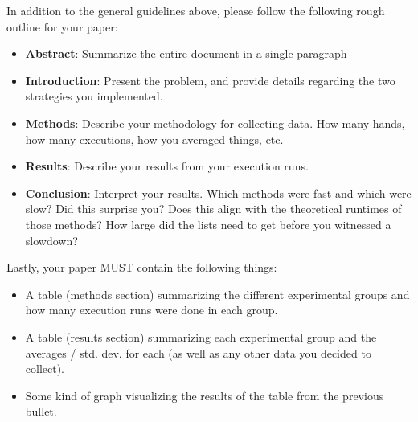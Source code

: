 \documentclass[paper=a4, fontsize=11pt, parskip=full]{scrartcl} %
\numberwithin{equation}{section} %
\numberwithin{figure}{section} %
\numberwithin{table}{section} %
\begin{document}
In addition to the general guidelines above, please follow the following rough outline for your paper:

\begin{itemize}
	\item \textbf{Abstract}: Summarize the entire document in a single paragraph
	\item \textbf{Introduction}: Present the problem, and provide details regarding the two strategies you implemented.
	\item \textbf{Methods}: Describe your methodology for collecting data. How many hands, how many executions, how you averaged things, etc.
	\item \textbf{Results}: Describe your results from your execution runs.
	\item \textbf{Conclusion}: Interpret your results. Which methods were fast and which were slow? Did this surprise you? Does this align with the theoretical runtimes of those methods? How large did the lists need to get before you witnessed a slowdown?
\end{itemize}

Lastly, your paper MUST contain the following things:

\begin{itemize}
	\item A table (methods section) summarizing the different experimental groups and how many execution runs were done in each group.
	\item A table (results section) summarizing each experimental group and the averages / std. dev. for each (as well as any other data you decided to collect).
	\item Some kind of graph visualizing the results of the table from the previous bullet.
\end{itemize}


\end{document}
